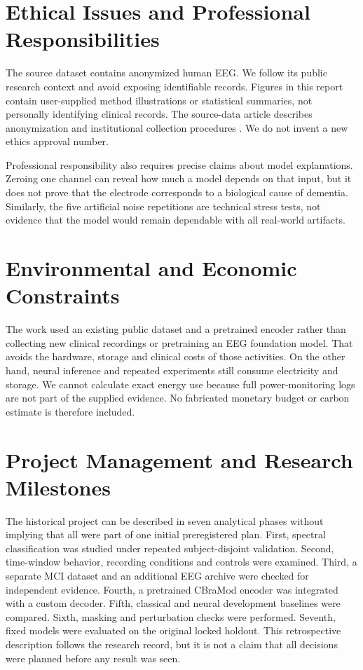 \section{Ethical Issues and Professional Responsibilities}
The source dataset contains anonymized human EEG. We follow its public research context and avoid exposing identifiable records. Figures in this report contain user-supplied method illustrations or statistical summaries, not personally identifying clinical records. The source-data article describes anonymization and institutional collection procedures \cite{miltiadous2023dataset}. We do not invent a new ethics approval number.

Professional responsibility also requires precise claims about model explanations. Zeroing one channel can reveal how much a model depends on that input, but it does not prove that the electrode corresponds to a biological cause of dementia. Similarly, the five artificial noise repetitions are technical stress tests, not evidence that the model would remain dependable with all real-world artifacts.

\section{Environmental and Economic Constraints}
The work used an existing public dataset and a pretrained encoder rather than collecting new clinical recordings or pretraining an EEG foundation model. That avoids the hardware, storage and clinical costs of those activities. On the other hand, neural inference and repeated experiments still consume electricity and storage. We cannot calculate exact energy use because full power-monitoring logs are not part of the supplied evidence. No fabricated monetary budget or carbon estimate is therefore included.

\section{Project Management and Research Milestones}
The historical project can be described in seven analytical phases without implying that all were part of one initial preregistered plan. First, spectral classification was studied under repeated subject-disjoint validation. Second, time-window behavior, recording conditions and controls were examined. Third, a separate MCI dataset and an additional EEG archive were checked for independent evidence. Fourth, a pretrained CBraMod encoder was integrated with a custom decoder. Fifth, classical and neural development baselines were compared. Sixth, masking and perturbation checks were performed. Seventh, fixed models were evaluated on the original locked holdout. This retrospective description follows the research record, but it is not a claim that all decisions were planned before any result was seen.

